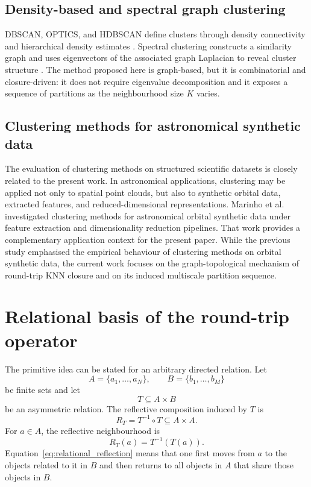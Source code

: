 \documentclass[pdflatex,sn-mathphys-num]{sn-jnl}
\begin{document}
\subsection{Density-based and spectral graph clustering}

DBSCAN, OPTICS, and HDBSCAN define clusters through density connectivity and hierarchical density estimates \citep{EsterKriegelSanderXu1996,AnkerstBreunigKriegelSander1999,CampelloMoulaviSander2013,CampelloMoulaviZimekSander2015}. Spectral clustering constructs a similarity graph and uses eigenvectors of the associated graph Laplacian to reveal cluster structure \citep{NgJordanWeiss2002,VonLuxburg2007}. The method proposed here is graph-based, but it is combinatorial and closure-driven: it does not require eigenvalue decomposition and it exposes a sequence of partitions as the neighbourhood size $K$ varies.

\subsection{Clustering methods for astronomical synthetic data}

The evaluation of clustering methods on structured scientific datasets is closely related to the present work. In astronomical applications, clustering may be applied not only to spatial point clouds, but also to synthetic orbital data, extracted features, and reduced-dimensional representations. Marinho et al.~\citep{PereiraMarinho2026ClusteringAO} investigated clustering methods for astronomical orbital synthetic data under feature extraction and dimensionality reduction pipelines. That work provides a complementary application context for the present paper. While the previous study emphasised the empirical behaviour of clustering methods on orbital synthetic data, the current work focuses on the graph-topological mechanism of round-trip KNN closure and on its induced multiscale partition sequence.

\section{Relational basis of the round-trip operator}\label{sec:relational_origin}

The primitive idea can be stated for an arbitrary directed relation. Let
\begin{equation}
A=\{a_1,\ldots,a_N\},\qquad B=\{b_1,\ldots,b_M\}
\end{equation}
be finite sets and let
\begin{equation}
T\subseteq A\times B
\end{equation}
be an asymmetric relation. The reflective composition induced by $T$ is
\begin{equation}
R_T=T^{-1}\circ T\subseteq A\times A.
\end{equation}
For $a\in A$, the reflective neighbourhood is
\begin{equation}
R_T(a)=T^{-1}(T(a)).
\label{eq:relational_reflection}
\end{equation}
Equation~\eqref{eq:relational_reflection} means that one first moves from $a$ to the objects related to it in $B$ and then returns to all objects in $A$ that share those objects in $B$.
\end{document}
